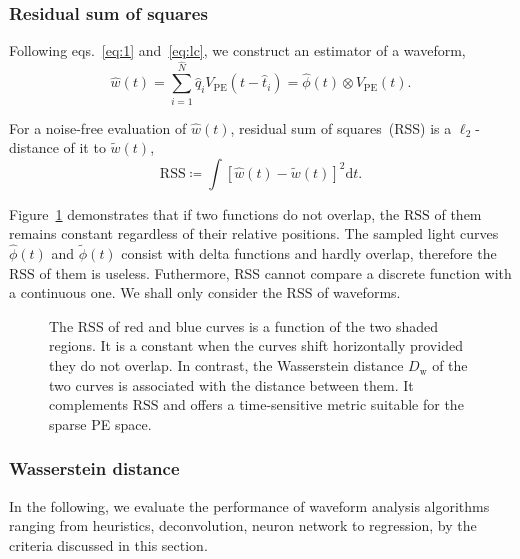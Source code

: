 \subsubsection{Residual sum of squares}
\label{sec:rss}

Following eqs.~\eqref{eq:1} and~\eqref{eq:lc}, we construct an estimator of a waveform,
\begin{equation}
  \label{eq:w-hat}
  \hat{w}(t) = \sum_{i=1}^{\hat{N}}\hat{q}_i V_\mathrm{PE}(t-\hat{t}_i) = \hat{\phi}(t) \otimes V_\mathrm{PE}(t).
\end{equation}

For a noise-free evaluation of $\hat{w}(t)$, residual sum of squares~(RSS) is a $\ell_2$-distance of it to $\tilde{w}(t)$,
\begin{equation}
  \label{eq:rss}
  \mathrm{RSS} \coloneqq\int\left[\hat{w}(t) - \tilde{w}(t)\right]^2\mathrm{d}t.
\end{equation}

Figure~\ref{fig:l2} demonstrates that if two functions do not overlap, the $\mathrm{RSS}$ of them remains constant regardless of their relative positions.  The sampled light curves $\hat{\phi}(t)$ and $\tilde{\phi}(t)$ consist with delta functions and hardly overlap, therefore the $\mathrm{RSS}$ of them is useless.  Futhermore, RSS cannot compare a discrete function with a continuous one.  We shall only consider the $\mathrm{RSS}$ of waveforms.

\begin{figure}[H]
  \centering
  \resizebox{0.6\textwidth}{!}{}
  \caption{\label{fig:l2} The $\mathrm{RSS}$ of red and blue curves is a function of the two shaded regions. It is a constant when the curves shift horizontally provided they do not overlap.  In contrast, the Wasserstein distance $D_\mathrm{w}$ of the two curves is associated with the distance between them.  It complements $\mathrm{RSS}$ and offers a time-sensitive metric suitable for the sparse PE space.}
\end{figure}

\subsubsection{Wasserstein distance}
\label{sec:W-dist}



In the following, we  evaluate the performance of waveform analysis algorithms ranging from heuristics, deconvolution, neuron network to regression, by the criteria discussed in this section.

